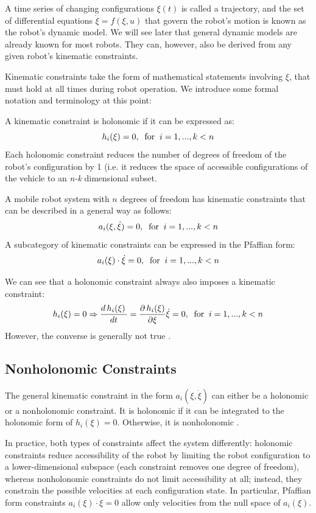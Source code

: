 \documentclass[twoside]{article}
\begin{document}
A time series of changing configurations $ \xi(t) $ is called a trajectory, and the set of differential equations $ \dot{\xi} = f(\xi,u) $ that govern the robot's motion is known as the robot's dynamic model. We will see later that general dynamic models are already known for most robots. They can, however, also be derived from any given robot's kinematic constraints.

Kinematic constraints take the form of mathematical statements involving $\xi$, that must hold at all times during robot operation. We introduce some formal notation and terminology at this point:

\begin{frm-def}
A kinematic constraint is holonomic if it can be expressed as:
$$
h_i(\xi) = 0,\;\;\textup{for}\;\;i = 1,...,k < n
$$
Each holonomic constraint reduces the number of degrees of freedom of the robot's configuration by 1 (i.e. it reduces the space of accessible configurations of the vehicle to an \textit{n-k} dimensional subset.
\end{frm-def}

\begin{frm-def}
A mobile robot system with $n$ degrees of freedom has kinematic constraints that can be described in a general way as follows:
$$
a_i (\xi, \dot{\xi})=0,\;\;\textup{for}\;\;i = 1,...,k < n
$$
A subcategory of kinematic constraints can be expressed in the Pfaffian form:
$$
a_i(\xi) \cdot \dot{\xi} = 0,\;\;\textup{for}\;\;i = 1,...,k < n
$$
\end{frm-def}

We can see that a holonomic constraint always also imposes a kinematic constraint:
$$
h_i(\xi) = 0 \Rightarrow \frac{d\,h_i(\xi)\, }{dt} = \frac{\partial\,h_i(\xi)}{\partial \xi} \dot{\xi} = 0,\;\;\textup{for}\;\;i = 1,...,k < n
$$
However, the converse is generally not true \cite{ssvo}.

\subsection*{Nonholonomic Constraints}

The general kinematic constraint in the form $ a_i (\xi, \dot{\xi}) $ can either be a holonomic or a nonholonomic constraint. It is holonomic if it can be integrated to the holonomic form of $ h_i(\xi) = 0 $. Otherwise, it is nonholonomic \cite{ssvo}.

In practice, both types of constraints affect the system differently: holonomic constraints reduce accessibility of the robot by limiting the robot configuration to a lower-dimensional subspace (each constraint removes one degree of freedom), whereas nonholonomic constraints do not limit accessibility at all; instead, they constrain the possible velocities at each configuration state. In particular, Pfaffian form constraints $ a_i(\xi) \cdot \dot{\xi} = 0 $ allow only velocities from the null space of $ a_i (\xi) $.
\end{document}
